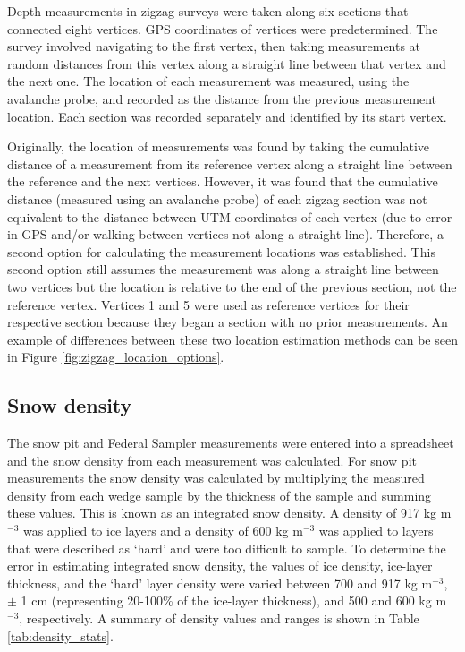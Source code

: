 \documentclass{sfuthesis}
\begin{document}
Depth measurements in zigzag surveys were taken along six sections that connected eight vertices. GPS coordinates of vertices were predetermined. The survey involved navigating to the first vertex, then taking measurements at random distances from this vertex along a straight line between that vertex and the next one. The location of each measurement was measured, using the avalanche probe, and recorded as the distance from the previous measurement location. Each section was recorded separately and identified by its start vertex. 

Originally, the location of measurements was found by taking the cumulative distance of a measurement from its reference vertex along a straight line between the reference and the next vertices. However, it was found that the cumulative distance (measured using an avalanche probe) of each zigzag section was not equivalent to the distance between UTM coordinates of each vertex (due to error in GPS and/or walking between vertices not along a straight line). Therefore, a second option for calculating the measurement locations was established. This second option still assumes the measurement was along a straight line between two vertices but the location is relative to the end of the previous section, not the reference vertex. Vertices 1 and 5 were used as reference vertices for their respective section because they began a section with no prior measurements. An example of differences between these two location estimation methods can be seen in Figure \ref{fig:zigzag_location_options}.


\subsection{Snow density}

The snow pit and Federal Sampler measurements were entered into a spreadsheet and the snow density from each measurement was calculated. For snow pit measurements the snow density was calculated by multiplying the measured density from each wedge sample by the thickness of the sample and summing these values. This is known as an integrated snow density. A density of 917 kg m$^{-3}$ was applied to ice layers and a density of 600 kg m$^{-3}$ was applied to layers that were described as `hard' and were too difficult to sample. To determine the error in estimating integrated snow density, the values of ice density, ice-layer thickness, and the `hard' layer density were varied between 700 and 917 kg m$^{-3}$, $\pm$ 1 cm (representing 20-100\% of the ice-layer thickness), and 500 and 600 kg m$^{-3}$, respectively.  A summary of density values and ranges is shown in Table \ref{tab:density_stats}.
\end{document}
